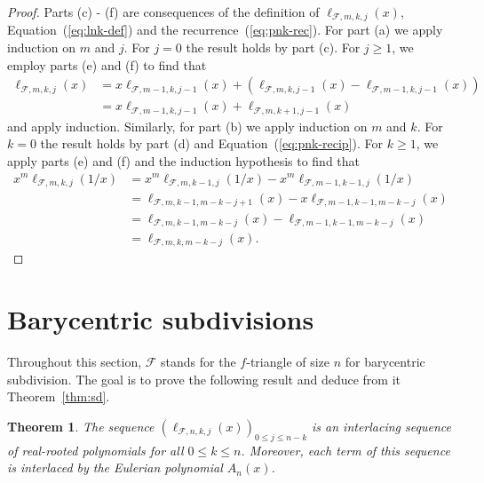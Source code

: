 \documentclass[11pt]{amsart}
\newtheorem{theorem}{Theorem}[section]
\newcommand{\fF}{{\mathcal F}}
\begin{document}
\begin{proof}
Parts (c) - (f) are consequences of the definition 
of $\ell_{\fF,m,k,j}(x)$, Equation~(\ref{eq:lnk-def})
and the recurrence~(\ref{eq:pnk-rec}). For part (a) 
we apply induction on $m$ and $j$. For $j=0$ the 
result holds by part (c). For $j \ge 1$, we employ 
parts (e) and (f) to find that
%
\begin{align*} \ell_{\fF,m,k,j}(x) & = x 
\ell_{\fF,m-1,k,j-1}(x) + \left( \ell_{\fF,m,k,j-1}
(x) - \ell_{\fF,m-1,k,j-1}(x) \right) \\ 
& = x \ell_{\fF,m-1,k,j-1}(x) + 
      \ell_{\fF,m,k+1,j-1}(x) 
\end{align*}
%   
and apply induction. Similarly, for part (b) we 
apply induction on $m$ and $k$. For $k=0$ the result 
holds by part (d) and Equation~(\ref{eq:pnk-recip}). 
For $k \ge 1$, we apply parts (e) and (f) and the 
induction hypothesis to find that
%
\begin{align*} x^m \ell_{\fF,m,k,j}(1/x) & = 
x^m \ell_{\fF,m,k-1,j}(1/x) - x^m 
    \ell_{\fF,m-1,k-1,j}(1/x) \\ & = 
\ell_{\fF,m,k-1,m-k-j+1}(x) - x 
    \ell_{\fF,m-1,k-1,m-k-j}(x) \\ & = 
\ell_{\fF,m,k-1,m-k-j}(x) -
    \ell_{\fF,m-1,k-1,m-k-j}(x) \\ & =
\ell_{\fF,m,k,m-k-j}(x).
\end{align*}
%   
\end{proof}

\section{Barycentric subdivisions}
\label{sec:sd}

Throughout this section, $\fF$ stands for the 
$f$-triangle of size $n$ for barycentric subdivision.
The goal is to prove the following result and deduce 
from it Theorem~\ref{thm:sd}.
%
\begin{theorem} \label{thm:sd-interlace} 
The sequence $(\ell_{\fF,n,k,j}(x))_{0 \le j \le n-k}$ 
is an interlacing sequence of real-rooted polynomials
for all $0 \le k \le n$. Moreover, each term of this 
sequence is interlaced by the Eulerian polynomial 
$A_n(x)$. 
\end{theorem}
\end{document}
